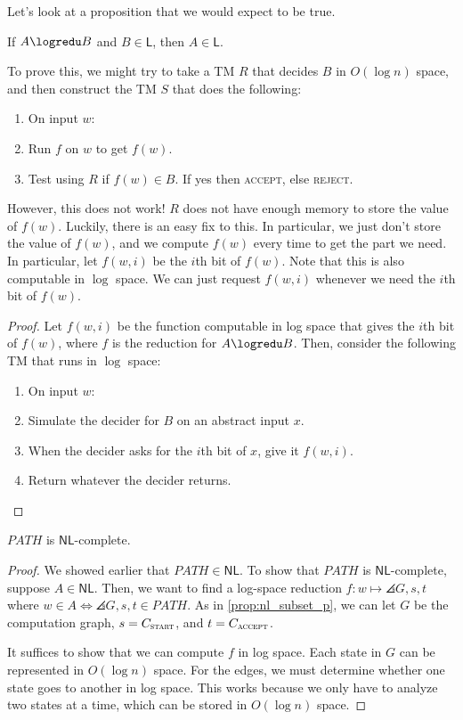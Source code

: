 \documentclass{standalone}
\begin{document}
Let's look at a proposition that we would expect to be true.
\begin{proposition}
	If \(A \logredu B\) and \(B \in \mathsf{L}\), then \(A \in \mathsf{L}\).
\end{proposition}
To prove this, we might try to take a \textsf{TM} \(R\) that decides \(B\) in \(O(\log n)\) space, and then construct the \textsf{TM} \(S\) that does the following:
\begin{enumerate}[start=0]
	\item On input \(w\):
	\item Run \(f\) on \(w\) to get \(f(w)\).
	\item Test using \(R\) if \(f(w) \in B\). If yes then \textsc{accept}, else \textsc{reject}.
\end{enumerate}
However, this does not work! \(R\) does not have enough memory to store the value of \(f(w)\). Luckily, there is an easy fix to this. In particular, we just don't store the value of \(f(w)\), and we compute \(f(w)\) every time to get the part we need. In particular, let \(f(w, i)\) be the \(i\)th bit of \(f(w)\). Note that this is also computable in \(\log\) space. We can just request \(f(w, i)\) whenever we need the \(i\)th bit of \(f(w)\).
\begin{proof}
	Let \(f(w, i)\) be the function computable in log space that gives the \(i\)th bit of \(f(w)\), where \(f\) is the reduction for \(A \logredu B\). Then, consider the following \textsf{TM} that runs in \(\log\) space:
	\begin{enumerate}[start=0]
		\item On input \(w\):
		\item Simulate the decider for \(B\) on an abstract input \(x\).
		\item When the decider asks for the \(i\)th bit of \(x\), give it \(f(w, i)\).
		\item Return whatever the decider returns.\qedhere
	\end{enumerate}
\end{proof}

\begin{theorem}
	\(\textit{PATH}\) is \(\mathsf{NL}\)-complete.
\end{theorem}
\begin{proof}
	We showed earlier that \(\textit{PATH} \in \mathsf{NL}\). To show that \(\textit{PATH}\) is \(\mathsf{NL}\)-complete, suppose \(A \in \mathsf{NL}\). Then, we want to find a log-space reduction \(f \colon w \mapsto \angles{G, s, t}\) where \(w \in A \iff \angles{G, s, t} \in \textit{PATH}\). As in \cref{prop:nl_subset_p}, we can let \(G\) be the computation graph, \(s = C_{\textsc{start}}\), and \(t = C_{\textsc{accept}}\).

	It suffices to show that we can compute \(f\) in log space. Each state in \(G\) can be represented in \(O(\log n)\) space. For the edges, we must determine whether one state goes to another in log space. This works because we only have to analyze two states at a time, which can be stored in \(O(\log n)\) space.
\end{proof}
\end{document}
